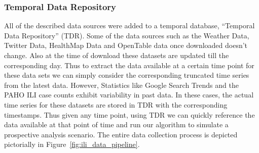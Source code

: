 \subsubsection{Temporal Data Repository}
All of the described data sources were
added to a temporal database, ``Temporal Data Repository'' (TDR). Some of the
data sources such as the Weather Data, Twitter Data, HealthMap Data and
OpenTable data once downloaded doesn't change. Also at the time of download
these datasets are updated till the corresponding day.  Thus to extract the
data available at a certain time point for these data sets we can simply
consider the corresponding truncated time series from the latest data. However,
Statistics like Google Search Trends and the PAHO ILI case counts exhibit
variability in past data. In these cases, the actual time series for these datasets are
stored in TDR with the corresponding timestamps. Thus given any time point,
using TDR we can quickly reference the data available at that point of time and
run our algorithm to simulate a prospective analysis scenario.  The entire data
collection process is depicted pictorially in
Figure~\ref{fig:ili_data_pipeline}.



